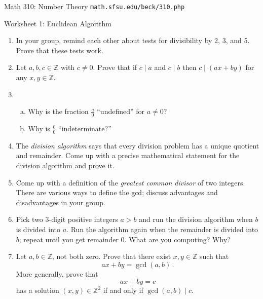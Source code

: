 \documentclass[11pt]{article}
\def\Z{\mathbb{Z}}
\begin{document}
\setlength{\parindent}{0pt}
\setlength{\parskip}{0.2cm}

$\mbox{}$
\vspace{-1in}

{ Math 310: Number Theory}
\hfill
{\tt math.sfsu.edu/beck/310.php}

\vspace{.3in}

\begin{center}
\Large{Worksheet 1: Euclidean Algorithm}
\end{center}

\begin{enumerate}

\item In your group, remind each other about tests for divisibility by 2, 3, and 5.
Prove that these tests work.

\item Let $a, b, c \in \Z$ with $c \ne 0$.
Prove that if $c \mid a$ and $c \mid b$ then $c \mid (ax+by)$ for any $x, y \in \Z$. 

\item 
\begin{enumerate}[(a)]
  \item Why is the fraction $\frac{a}{0}$ ``undefined'' for $a \ne 0$?
  \item Why is $\frac{0}{0}$ ``indeterminate?''
\end{enumerate}

\item The \emph{division algorithm} says that every division problem has a unique quotient and remainder.
Come up with a precise mathematical statement for the division algorithm and prove it.

\item Come up with a definition of the \emph{greatest common divisor} of two integers.
There are various ways to define the gcd; discuss advantages and disadvantages in your group.

\item Pick two 3-digit positive integers $a > b$ and run the division algorithm when $b$ is divided into $a$.
Run the algorithm again when the remainder is divided into $b$; repeat until you get remainder 0.
What are you computing? Why?

\item Let $a, b \in \Z$, not both zero.
Prove that there exist $x, y \in \Z$ such that
\[
  ax+by = \gcd(a,b) \, .
\]
More generally, prove that
\[
  ax+by = c
\]
has a solution $(x,y) \in \Z^2$ if and only if $\gcd(a,b) \mid c$.


\end{enumerate}
\end{document}
